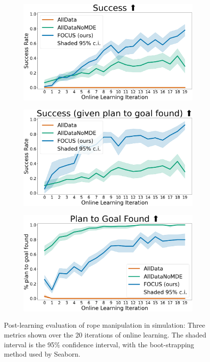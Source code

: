\begin{figure}
     \centering
     \begin{subfigure}[b]{0.32\textwidth}
         \centering
         \includegraphics[width=\linewidth]{Chap4/images/success.png}
     \end{subfigure}
     \hfill
     \begin{subfigure}[b]{0.32\textwidth}
         \centering
         \includegraphics[width=\linewidth]{Chap4/images/success_given_plan_found.png} 
     \end{subfigure}
     \hfill
     \begin{subfigure}[b]{0.32\textwidth}
         \centering
         \includegraphics[width=\linewidth]{Chap4/images/plan_found.png}
     \end{subfigure}
    \caption{Post-learning evaluation of rope manipulation in simulation: Three metrics shown over the 20 iterations of online learning. The shaded interval is the 95\% confidence interval, with the boot-strapping method used by Seaborn.}
    \label{ICRA:fig:sim_rope_results}
\end{figure}

